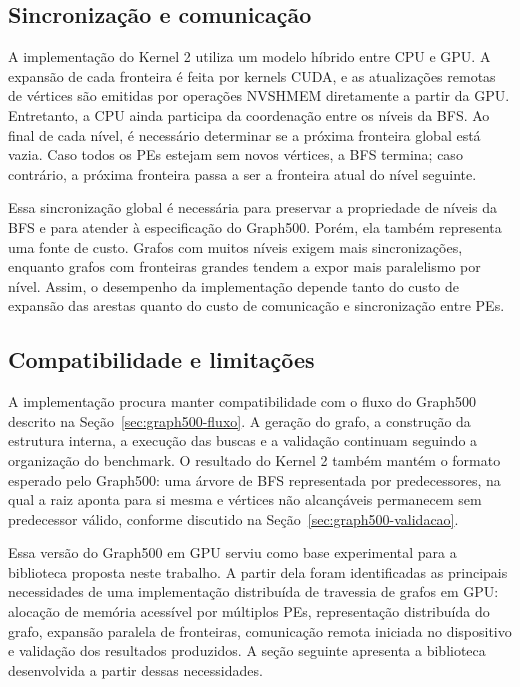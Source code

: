 \subsection{Sincronização e comunicação}

A implementação do Kernel 2 utiliza um modelo híbrido entre CPU e GPU. A expansão
de cada fronteira é feita por kernels CUDA, e as atualizações remotas de vértices
são emitidas por operações NVSHMEM diretamente a partir da GPU. Entretanto, a CPU
ainda participa da coordenação entre os níveis da BFS. Ao final de cada nível, é
necessário determinar se a próxima fronteira global está vazia. Caso todos os PEs
estejam sem novos vértices, a BFS termina; caso contrário, a próxima fronteira
passa a ser a fronteira atual do nível seguinte.

Essa sincronização global é necessária para preservar a propriedade de níveis da
BFS e para atender à especificação do Graph500. Porém, ela também representa uma
fonte de custo. Grafos com muitos níveis exigem mais sincronizações, enquanto
grafos com fronteiras grandes tendem a expor mais paralelismo por nível. Assim, o
desempenho da implementação depende tanto do custo de expansão das arestas quanto
do custo de comunicação e sincronização entre PEs.

\subsection{Compatibilidade e limitações}

A implementação procura manter compatibilidade com o fluxo do Graph500 descrito
na Seção~\ref{sec:graph500-fluxo}. A geração do grafo, a construção da estrutura
interna, a execução das buscas e a validação continuam seguindo a organização do
benchmark. O resultado do Kernel 2 também mantém o formato esperado pelo
Graph500: uma árvore de BFS representada por predecessores, na qual a raiz aponta
para si mesma e vértices não alcançáveis permanecem sem predecessor válido,
conforme discutido na Seção~\ref{sec:graph500-validacao}.

Essa versão do Graph500 em GPU serviu como base experimental para a biblioteca
proposta neste trabalho. A partir dela foram identificadas as principais
necessidades de uma implementação distribuída de travessia de grafos em GPU:
alocação de memória acessível por múltiplos PEs, representação distribuída do
grafo, expansão paralela de fronteiras, comunicação remota iniciada no dispositivo
e validação dos resultados produzidos. A seção seguinte apresenta a biblioteca
desenvolvida a partir dessas necessidades.

